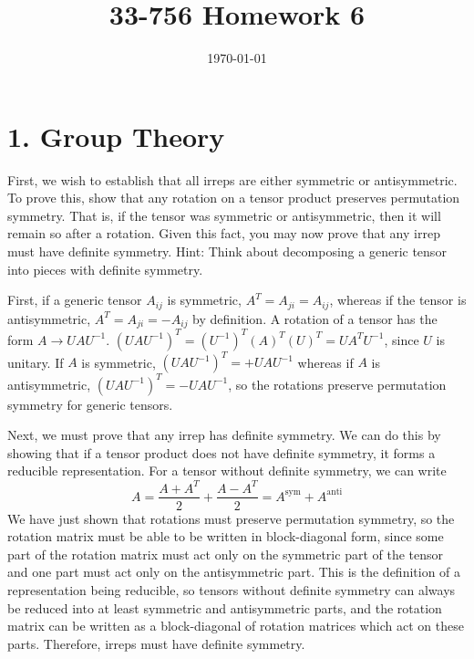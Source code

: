 \documentclass[a4paper,twoside]{article}
\title{33-756 Homework 6}
\date{\today}
\begin{document}
\maketitle

\section*{1. Group Theory}
First, we wish to establish that all irreps are either symmetric or antisymmetric. To prove this, show that any rotation on a tensor product preserves permutation symmetry. That is, if the tensor was symmetric or antisymmetric, then it will remain so after a rotation. Given this fact, you may now prove that any irrep must have definite symmetry. Hint: Think about decomposing a generic tensor into pieces with definite symmetry.

\begin{problem}
    First, if a generic tensor $ A_{ij} $ is symmetric, $ A^T = A_{ji} = A_{ij} $, whereas if the tensor is antisymmetric, $ A^T = A_{ji} = -A_{ij} $ by definition. A rotation of a tensor has the form $ A \to U A U^{-1} $. $ (U A U^{-1})^T = (U^{-1})^T (A)^T (U)^T = U A^T U^{-1} $, since $ U $ is unitary. If $ A $ is symmetric, $ (U A U^{-1})^T = + U A U^{-1} $ whereas if $ A $ is antisymmetric, $ (U A U^{-1})^T = - U A U^{-1} $, so the rotations preserve permutation symmetry for generic tensors.

    Next, we must prove that any irrep has definite symmetry. We can do this by showing that if a tensor product does not have definite symmetry, it forms a reducible representation. For a tensor without definite symmetry, we can write
    \begin{equation}
        A = \frac{A + A^T}{2} + \frac{A - A^T}{2} = A^{\text{sym}} + A^{\text{anti}}
    \end{equation}
    We have just shown that rotations must preserve permutation symmetry, so the rotation matrix must be able to be written in block-diagonal form, since some part of the rotation matrix must act only on the symmetric part of the tensor and one part must act only on the antisymmetric part. This is the definition of a representation being reducible, so tensors without definite symmetry can always be reduced into at least symmetric and antisymmetric parts, and the rotation matrix can be written as a block-diagonal of rotation matrices which act on these parts. Therefore, irreps must have definite symmetry.
\end{problem}
\end{document}
